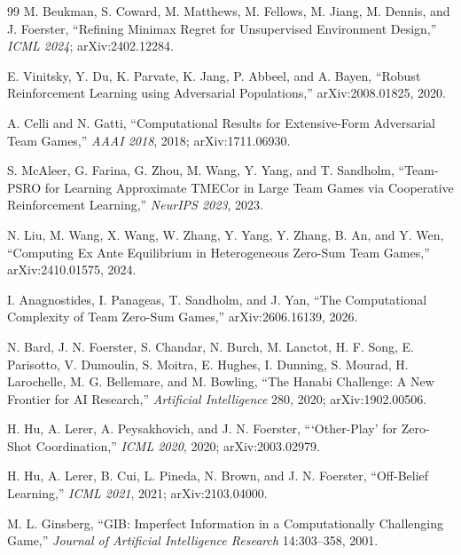 \documentclass[11pt]{article}
\theoremstyle{definition}
\begin{document}
\begin{thebibliography}{99}
M. Beukman, S. Coward, M. Matthews, M. Fellows, M. Jiang, M. Dennis, and
J. Foerster, ``Refining Minimax Regret for Unsupervised Environment Design,''
\emph{ICML 2024}; arXiv:2402.12284.

E. Vinitsky, Y. Du, K. Parvate, K. Jang, P. Abbeel, and A. Bayen, ``Robust
Reinforcement Learning using Adversarial Populations,'' arXiv:2008.01825, 2020.


A. Celli and N. Gatti, ``Computational Results for Extensive-Form Adversarial
Team Games,'' \emph{AAAI 2018}, 2018; arXiv:1711.06930.

S. McAleer, G. Farina, G. Zhou, M. Wang, Y. Yang, and T. Sandholm, ``Team-PSRO
for Learning Approximate TMECor in Large Team Games via Cooperative
Reinforcement Learning,'' \emph{NeurIPS 2023}, 2023.

N. Liu, M. Wang, X. Wang, W. Zhang, Y. Yang, Y. Zhang, B. An, and Y. Wen,
``Computing Ex Ante Equilibrium in Heterogeneous Zero-Sum Team Games,''
arXiv:2410.01575, 2024.

I. Anagnostides, I. Panageas, T. Sandholm, and J. Yan, ``The Computational
Complexity of Team Zero-Sum Games,'' arXiv:2606.16139, 2026.

N. Bard, J. N. Foerster, S. Chandar, N. Burch, M. Lanctot, H. F. Song,
E. Parisotto, V. Dumoulin, S. Moitra, E. Hughes, I. Dunning, S. Mourad,
H. Larochelle, M. G. Bellemare, and M. Bowling, ``The Hanabi Challenge: A New
Frontier for AI Research,'' \emph{Artificial Intelligence} 280, 2020;
arXiv:1902.00506.

H. Hu, A. Lerer, A. Peysakhovich, and J. N. Foerster, ```Other-Play' for
Zero-Shot Coordination,'' \emph{ICML 2020}, 2020; arXiv:2003.02979.

H. Hu, A. Lerer, B. Cui, L. Pineda, N. Brown, and J. N. Foerster, ``Off-Belief
Learning,'' \emph{ICML 2021}, 2021; arXiv:2103.04000.


M. L. Ginsberg, ``GIB: Imperfect Information in a Computationally Challenging
Game,'' \emph{Journal of Artificial Intelligence Research} 14:303--358, 2001.


\end{thebibliography}
\end{document}
